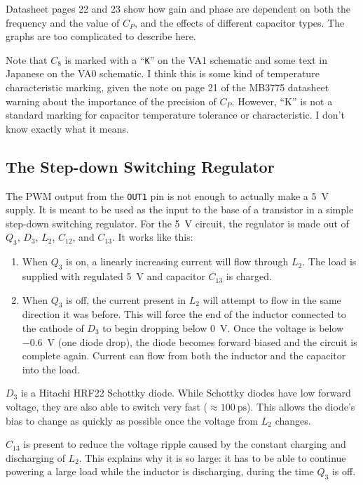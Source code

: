 \documentclass{article}
\newcommand{\chippin}{\texttt}
\newcommand{\model}{\textsf}
\begin{document}
Datasheet pages 22 and 23 show how gain and phase are dependent on
both the frequency and the value of $C_P$, and the effects of
different capacitor types. The graphs are too complicated to describe
here.

Note that $C_8$ is marked with a ``\texttt{K}'' on the \model{VA1}
schematic and some text in Japanese on the \model{VA0} schematic. I
think this is some kind of temperature characteristic marking, given
the note on page 21 of the \model{MB3775} datasheet warning about the
importance of the precision of $C_P$. However, ``K'' is not a standard
marking for capacitor temperature tolerance or characteristic. I don't
know exactly what it means.

\subsection{The Step-down Switching Regulator}
\label{sec:step-down_regulator}
The PWM output from the \chippin{OUT1} pin is not enough to actually
make a \qty{5}{\volt} supply. It is meant to be used as the input to
the base of a transistor in a simple step-down switching
regulator. For the \qty{5}{\volt} circuit, the regulator is made out
of $Q_3$, $D_3$, $L_2$, $C_{12}$, and $C_{13}$. It works like this:

\begin{enumerate}
\item When $Q_3$ is on, a linearly increasing current will flow
  through $L_2$. The load is supplied with regulated \qty{5}{\volt}
  and capacitor $C_{13}$ is charged.
\item When $Q_3$ is off, the current present in $L_2$ will attempt to
  flow in the same direction it was before. This will force the end of
  the inductor connected to the cathode of $D_3$ to begin dropping
  below \qty{0}{\volt}. Once the voltage is below \qty{-0.6}{\volt}
  (one diode drop), the diode becomes forward biased and the circuit
  is complete again. Current can flow from both the inductor and the
  capacitor into the load.
\end{enumerate}

$D_3$ is a Hitachi \model{HRF22} Schottky diode. While Schottky diodes
have low forward voltage, they are also able to switch very fast
($\approx{}\qty{100}{\pico\second}$). This allows the diode's bias to
change as quickly as possible once the voltage from $L_2$ changes.

$C_{13}$ is present to reduce the voltage ripple caused by the
constant charging and discharging of $L_2$. This explains why it is so
large: it has to be able to continue powering a large load while the
inductor is discharging, during the time $Q_3$ is off.
\end{document}
